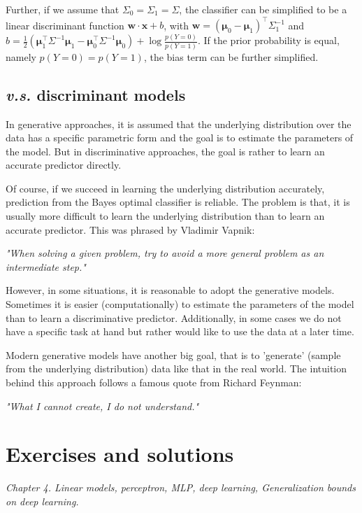 \documentclass{article}
\begin{document}
	Further, if we assume that $\Sigma_0=\Sigma_1=\Sigma$, the classifier can be simplified to be a linear discriminant function $\mathbf{w}\cdot\mathbf{x}+b$, with $\mathbf{w}=(\mathbf{\mu}_0 - \mathbf{\mu}_1)^\top\Sigma_1^{-1}$ and $b=\frac{1}{2} (\mathbf{\mu}_1^\top\Sigma^{-1}\mathbf{\mu}_1 - \mathbf{\mu}_0^\top\Sigma^{-1}\mathbf{\mu}_0 ) + \log \frac{p(Y=0)}{p(Y=1)}$. If the prior probability is equal, namely $p(Y=0)=p(Y=1)$, the bias term can be further simplified.
	
	\subsection{\textit{v.s.} discriminant models}
	
	In generative approaches, it is assumed that the underlying distribution over the data has a specific parametric form and the goal is to estimate the parameters of the model. But in discriminative approaches, the goal is rather to learn an accurate predictor directly. 
	
	Of course, if we succeed in learning the underlying distribution accurately, prediction from the Bayes optimal classifier is reliable. The problem is that, it is usually more difficult to learn the underlying distribution than to learn an accurate predictor. This was phrased by Vladimir Vapnik:
\begin{center}
\textit{"When solving a given problem, try to avoid a more general problem as an intermediate step."}
\end{center}

	However, in some situations, it is reasonable to adopt the generative models. Sometimes it is easier (computationally) to estimate the parameters of the model than to learn a discriminative predictor. Additionally, in some cases we do not have a specific task at hand but rather would like to use the data at a later time.
	
	Modern generative models have another big goal, that is to 'generate' (sample from the underlying distribution) data like that in the real world. The intuition behind this approach follows a famous quote from Richard Feynman:

\begin{center}
\textit{"What I cannot create, I do not understand."}
\end{center}
	
\section{Exercises and solutions}

\textit{
      Chapter 4. Linear models, perceptron, MLP, deep learning, Generalization bounds on deep learning.}
\end{document}
